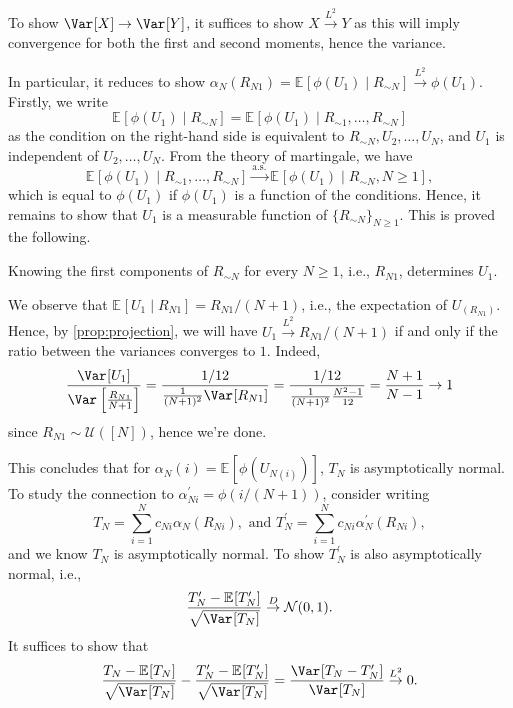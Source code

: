 \begin{note}
	To show \(\Var_{}[X] \to \Var_{}[Y] \), it suffices to show \(X \overset{L^2}{\to} Y \) as this will imply convergence for both the first and second moments, hence the variance.
\end{note}

In particular, it reduces to show \(\alpha _N(R_{N1}) = \mathbb{E}_{}[\phi (U_1) \mid R_{\sim N}] \overset{L^2}{\to} \phi (U_1)\). Firstly, we write
\[
	\mathbb{E}_{}[\phi (U_1) \mid R_{\sim N}]
	= \mathbb{E}_{}[\phi (U_1) \mid R_{\sim 1}, \dots , R_{\sim N}]
\]
as the condition on the right-hand side is equivalent to \(R_{\sim N}, U_2, \dots , U_N\), and \(U_1\) is independent of \(U_2, \dots , U_N\). From the theory of martingale, we have
\[
	\mathbb{E}_{}[\phi (U_1) \mid R_{\sim 1}, \dots , R_{\sim N}]
	\overset{\text{a.s.}}{\to} \mathbb{E}_{}[\phi (U_1) \mid R_{\sim N}, N \geq 1] ,
\]
which is equal to \(\phi (U_1)\) if \(\phi (U_1)\) is a function of the conditions. Hence, it remains to show that \(U_1\) is a measurable function of \(\{ R_{\sim N} \}_{N \geq 1}\). This is proved the following.

\begin{claim}\label{clm:lec23}
	Knowing the first components of \(R_{\sim N}\) for every \(N\geq 1\), i.e., \(R_{N1}\), determines \(U_1\).
\end{claim}
\begin{explanation}
	We observe that \(\mathbb{E}_{}[U_1 \mid R_{N1}] = R_{N1} / (N+1)\), i.e., the expectation of \(U_{(R_{N1})}\). Hence, by \autoref{prop:projection}, we will have \(U_1 \overset{L^2}{\to} R_{N1} / (N+1)\) if and only if the ratio between the variances converges to \(1\). Indeed,
	\[
		\frac{\Var_{}[U_1] }{\Var_{}\left[\frac{R_{N1}}{N+1}\right] }
		= \frac{1 / 12}{\frac{1}{(N+1)^2}\Var_{}[R_{N1}] }
		= \frac{1 / 12}{\frac{1}{(N+1)^2} \frac{N^2 - 1}{12}}
		= \frac{N+1}{N - 1}
		\to 1
	\]
	since \(R_{N1} \sim \mathcal{U} ([N])\), hence we're done.
\end{explanation}

This concludes that for \(\alpha _N(i) = \mathbb{E}_{}[\phi (U_{N(i)})] \), \(T_N\) is asymptotically normal. To study the connection to \(\alpha _{Ni}^{\prime} = \phi (i / (N+1))\), consider writing
\[
	T_N = \sum_{i=1}^{N} c_{Ni} \alpha _N(R_{Ni}), \text{ and }
	T_N^{\prime} = \sum_{i=1}^{N} c_{Ni} \alpha _N^{\prime} (R_{Ni}),
\]
and we know \(T_N\) is asymptotically normal. To show \(T_N^{\prime} \) is also asymptotically normal, i.e.,
\[
	\frac{T_N^{\prime} - \mathbb{E}_{}[T_N^{\prime} ] }{\sqrt{\Var_{}[T_N] } }
	\overset{D}{\to} \mathcal{N} (0, 1).
\]
It suffices to show that
\[
	\frac{T_N - \mathbb{E}_{}[T_N] }{\sqrt{\Var_{}[T_N] } } - \frac{T_N^{\prime} - \mathbb{E}_{}[T_N^{\prime} ] }{\sqrt{\Var_{}[T_N] } }
	= \frac{\Var_{}[T_N - T_N^{\prime} ] }{\Var_{}[T_N]}
	\overset{L^2}{\to} 0.
\]

